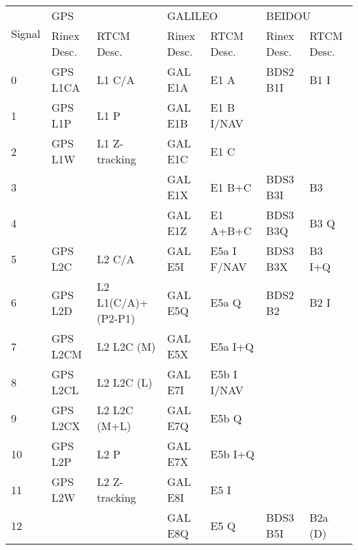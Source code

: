 \documentclass[9pt]{extarticle}
\numberwithin{table}{subsection}
\numberwithin{field}{subsection}
\begin{document}
\begin{center}
  \begin{longtable}{l|ll|ll|ll}
    \toprule
    \multirow{2}{*}{Signal}& \multicolumn{2}{l|}{GPS}          & \multicolumn{2}{l|}{GALILEO} & \multicolumn{2}{l}{BEIDOU} \\ \cline{2-7}
                           & Rinex Desc. & RTCM Desc.         & Rinex Desc.  & RTCM Desc.   & Rinex Desc.  & RTCM Desc.  \\
    \midrule
    0                      & GPS L1CA    & L1 C/A             & GAL E1A      & E1 A         & BDS2 B1I     & B1 I        \\
    1                      & GPS L1P     & L1 P               & GAL E1B      & E1 B I/NAV   &              &             \\
    2                      & GPS L1W     & L1 Z-tracking      & GAL E1C      & E1 C         &              &             \\
    3                      &             &                    & GAL E1X      & E1 B+C       & BDS3 B3I     & B3          \\
    4                      &             &                    & GAL E1Z      & E1 A+B+C     & BDS3 B3Q     & B3 Q        \\
    5                      & GPS L2C     & L2 C/A             & GAL E5I      & E5a I F/NAV  & BDS3 B3X     & B3 I+Q      \\
    6                      & GPS L2D     & L2 L1(C/A)+(P2-P1) & GAL E5Q      & E5a Q        & BDS2 B2      & B2 I        \\
    7                      & GPS L2CM    & L2 L2C (M)         & GAL E5X      & E5a I+Q      &              &             \\
    8                      & GPS L2CL    & L2 L2C (L)         & GAL E7I      & E5b I I/NAV  &              &             \\
    9                      & GPS L2CX    & L2 L2C (M+L)       & GAL E7Q      & E5b Q        &              &             \\
    10                     & GPS L2P     & L2 P               & GAL E7X      & E5b I+Q      &              &             \\
    11                     & GPS L2W     & L2 Z-tracking      & GAL E8I      & E5 I         &              &             \\
    12                     &             &                    & GAL E8Q      & E5 Q         & BDS3 B5I     & B2a (D)     \\

\end{longtable}
\end{center}
\end{document}

